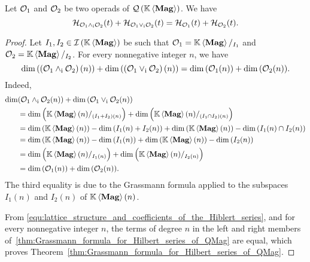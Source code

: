 \begin{Theorem}
    \label{thm:Grassmann_formula_for_Hilbert_series_of_QMag}
    Let $\mathcal{O}_1$ and $\mathcal{O}_2$ be two operads of $\mathcal{Q}\left(\mathbb{K} \left\langle\mathbf{Mag}\right\rangle\right)$. We have
    \begin{equation} \label{equ:lattice_structure_and_Hiblert_series}
        \mathcal{H}_{\mathcal{O}_1\wedge_{\mathrm{i}}\mathcal{O}_2}(t)
        +\mathcal{H}_{\mathcal{O}_1\vee_{\mathrm{i}}\mathcal{O}_2}(t)
        =\mathcal{H}_{\mathcal{O}_1}(t)+\mathcal{H}_{\mathcal{O}_2}(t).
    \end{equation}
\end{Theorem}
\begin{proof}
  Let $I_1, I_2 \in \mathcal{I}\left(\mathbb{K} \left\langle\mathbf{Mag}\right\rangle\right)$ be such that $\mathcal{O}_1 = \mathbb{K} \left\langle\mathbf{Mag}\right\rangle/_{I_1}$ and
    $\mathcal{O}_2 = \mathbb{K} \left\langle\mathbf{Mag}\right\rangle/_{I_2}$. For every nonnegative integer $n$, we have
  \begin{equation}
    \label{equ:lattice_structure_and_coefficients_of_the_Hiblert_series}
        \dim{\left(\left(\mathcal{O}_1\wedge_{\mathrm{i}}\mathcal{O}_2\right)(n)\right)}+
        \dim{\left(\left(\mathcal{O}_1\vee_{\mathrm{i}}\mathcal{O}_2\right)(n)\right)}=
        \dim{\left(\mathcal{O}_1(n)\right)}+\dim{\left(\mathcal{O}_2(n)\right)}.
  \end{equation}
  Indeed,
    \begin{equation}\begin{split}
        \dim & {\left(\mathcal{O}_1\wedge_{\mathrm{i}}\mathcal{O}_2(n)\right)}+
            \dim{\left(\mathcal{O}_1\vee_{\mathrm{i}}\mathcal{O}_2(n)\right)}\\
        &=\dim{\Big(\mathbb{K}\left\langle\mathbf{Mag}\right\rangle(n)/_{\left(I_1+I_2\right)(n)}\Big)}+
            \dim{\Big(\mathbb{K}\left\langle\mathbf{Mag}\right\rangle(n)/_{\left(I_1\cap I_2\right)(n)}\Big)}\\
        &=\dim{\left(\mathbb{K}\left\langle\mathbf{Mag}\right\rangle(n)\right)}-\dim{\left(I_1(n)+I_2(n)\right)}
            +\dim{\left(\mathbb{K}\left\langle\mathbf{Mag}\right\rangle(n)\right)}
            -\dim{\left(I_1(n)\cap I_2(n)\right)} \\
        &=\dim{\left(\mathbb{K}\left\langle\mathbf{Mag}\right\rangle(n)\right)}-\dim{\left(I_1(n)\right)}
            + \dim{\left(\mathbb{K}\left\langle\mathbf{Mag}\right\rangle(n)\right)}-\dim{\left(I_2(n)\right)}\\
        &=\dim{\Big(\mathbb{K}\left\langle\mathbf{Mag}\right\rangle(n)/_{I_1(n)}\Big)}
            +\dim{\Big(\mathbb{K}\left\langle\mathbf{Mag}\right\rangle(n)/_{I_2(n)}\Big)}\\
        &=\dim{\left(\mathcal{O}_1(n)\right)}+\dim{\left(\mathcal{O}_2(n)\right)}.
    \end{split}\end{equation}
    The third equality is due to the Grassmann formula applied to the
    subspaces $I_1(n)$ and $I_2(n)$ of $\mathbb{K} \left\langle\mathbf{Mag}\right\rangle(n)$.
    \smallbreak

    From
    \eqref{equ:lattice_structure_and_coefficients_of_the_Hiblert_series},
    and for every nonnegative integer $n$, the terms of degree $n$ in the
    left and right members
    of~\eqref{thm:Grassmann_formula_for_Hilbert_series_of_QMag} are
    equal, which proves
    Theorem~\ref{thm:Grassmann_formula_for_Hilbert_series_of_QMag}.
\end{proof}
\medbreak

